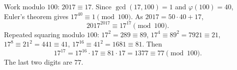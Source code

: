 Work modulo $100$: $2017\equiv17$. Since $\gcd(17,100)=1$ and $\varphi(100)=40$, Euler's theorem gives $17^{40}\equiv1\pmod{100}$. As $2017=50\cdot40+17$,
\[
2017^{2017}\equiv17^{17}\pmod{100}.
\]
Repeated squaring modulo $100$: $17^2=289\equiv89$, $17^4\equiv89^2=7921\equiv21$, $17^8\equiv21^2=441\equiv41$, $17^{16}\equiv41^2=1681\equiv81$. Then
\[
17^{17}=17^{16}\cdot17\equiv81\cdot17=1377\equiv77\pmod{100}.
\]
The last two digits are $\boxed{77}$.
